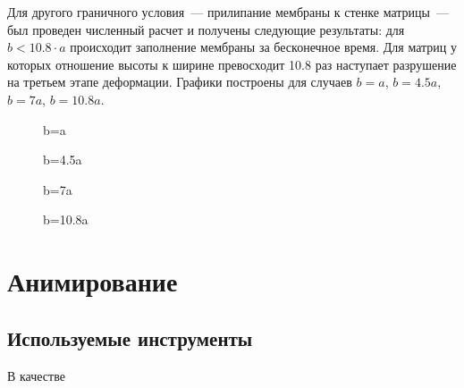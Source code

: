 Для другого граничного условия~--- прилипание мембраны к стенке матрицы~--- был проведен численный расчет и получены следующие результаты:
для \linebreak$b<10.8\cdot a$ происходит заполнение мембраны за бесконечное время. Для матриц у которых отношение высоты к ширине превосходит
10.8 раз наступает разрушение на третьем этапе деформации. Графики построены для случаев $b=a$, $b=4.5a$, $b=7a$, $b=10.8a$.
 
						 
		\begin{figure}[h!]	
				\def\svgwidth{\columnwidth}
				\caption{b=a} 
				\label{vert_stick_ba}
		\end{figure}

		\begin{figure}[h!]	
				\def\svgwidth{\columnwidth}
				\caption{b=4.5a} 
				\label{vert_stick_4ba}
		\end{figure}
				\begin{figure}[h!]	
				\def\svgwidth{\columnwidth}
				\caption{b=7a} 
				\label{vert_stick_7ba}
		\end{figure}
				\begin{figure}[h!]	
				\def\svgwidth{\columnwidth}
				\caption{b=10.8a} 
				\label{vert_stick_10ba}
		\end{figure}

\clearpage

\section{Анимирование}
\subsection{Используемые инструменты}
В качестве 